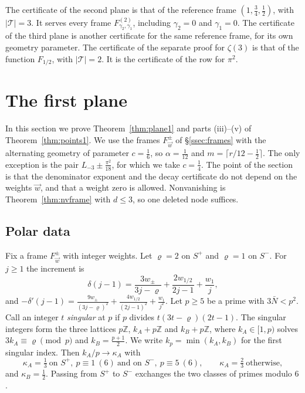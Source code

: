 \documentclass[11pt]{amsart}
\theoremstyle{definition}
\theoremstyle{remark}
\numberwithin{equation}{section}
\newcommand{\Z}{\mathbb Z}
\newcommand{\Lt}{L_{-3}}             %
\begin{document}
The certificate of the second plane is that of the reference frame $(1,\frac34,\frac12)$, with $|\mathcal T|=3$. It serves
every frame $F^{(2)}_{\gamma_2,\gamma_1}$, including $\gamma_2=0$ and $\gamma_1=0$. The certificate of the third plane
is another certificate for the same reference frame, for its own geometry parameter. The certificate of the separate
proof for $\zeta(3)$ is that of the function $F_{1/2}$, with $|\mathcal T|=2$. It is the certificate of the row for
$\pi^2$.

\section{The first plane}\label{sec:plane1}

In this section we prove Theorem~\ref{thm:plane1} and parts (iii)--(v) of Theorem~\ref{thm:points1}. We use the frames
$F^\pm_{\vec w}$ of \S\ref{ssec:frames} with the alternating geometry of parameter $c=\frac16$, so $\alpha=\frac1{12}$
and $m=\lceil r/12-\frac12\rceil$. The only exception is the pair $\Lt\pm\frac{\pi^2}{18}$, for which we take
$c=\frac14$. The point of the section is that the denominator exponent and the decay certificate do not depend on the
weights $\vec w$, and that a weight zero is allowed. Nonvanishing is Theorem~\ref{thm:nvframe} with $d\le3$, so one
deleted node suffices.

\subsection{Polar data}
Fix a frame $F^\pm_{\vec w}$ with integer weights. Let $\varrho=2$ on $S^+$ and $\varrho=1$ on $S^-$. For $j\ge1$ the
increment is
\[
 \delta(j-1)=\frac{3w_\pm}{3j-\varrho}+\frac{2w_{1/2}}{2j-1}+\frac{w_1}j ,
\]
and $-\delta'(j-1)=\frac{9w_\pm}{(3j-\varrho)^2}+\frac{4w_{1/2}}{(2j-1)^2}+\frac{w_1}{j^2}$. Let $p\ge5$ be a prime with
$3\bar N<p^2$. Call an integer $t$ \emph{singular} at $p$ if $p$ divides $t(3t-\varrho)(2t-1)$. The singular integers form
the three lattices $p\Z$, $k_A+p\Z$ and $k_B+p\Z$, where $k_A\in[1,p)$ solves $3k_A\equiv\varrho\pmod p$ and
$k_B=\frac{p+1}2$. We write $k_p=\min(k_A,k_B)$ for the first singular index. Then $k_A/p\to\kappa_A$ with
\[
 \kappa_A=\tfrac13\ \text{on } S^+,\ p\equiv1\ (6)\ \text{and on } S^-,\ p\equiv5\ (6),\qquad
 \kappa_A=\tfrac23\ \text{otherwise},
\]
and $\kappa_B=\frac12$. Passing from $S^+$ to $S^-$ exchanges the two classes of primes modulo $6$.
\end{document}
